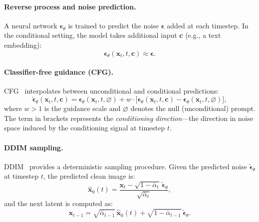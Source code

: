 \documentclass{article}
\begin{document}
\paragraph{Reverse process and noise prediction.}
A neural network $\boldsymbol{\epsilon}_\theta$ is trained to predict the noise $\boldsymbol{\epsilon}$ added at each timestep. In the conditional setting, the model takes additional input $\mathbf{c}$ (e.g., a text embedding):
\begin{equation}
    \boldsymbol{\epsilon}_\theta(\mathbf{x}_t, t, \mathbf{c}) \approx \boldsymbol{\epsilon}.
    \label{eq:noise_pred}
\end{equation}

\paragraph{Classifier-free guidance (CFG).}
CFG~\citep{ho2022classifier} interpolates between unconditional and conditional predictions:
\begin{equation}
    \tilde{\boldsymbol{\epsilon}}_\theta(\mathbf{x}_t, t, \mathbf{c}) = \boldsymbol{\epsilon}_\theta(\mathbf{x}_t, t, \varnothing) + w \cdot \bigl[\boldsymbol{\epsilon}_\theta(\mathbf{x}_t, t, \mathbf{c}) - \boldsymbol{\epsilon}_\theta(\mathbf{x}_t, t, \varnothing)\bigr],
    \label{eq:cfg}
\end{equation}
where $w > 1$ is the guidance scale and $\varnothing$ denotes the null (unconditional) prompt. The term in brackets represents the \emph{conditioning direction}---the direction in noise space induced by the conditioning signal at timestep $t$.

\paragraph{DDIM sampling.}
DDIM~\citep{song2021denoising} provides a deterministic sampling procedure. Given the predicted noise $\tilde{\boldsymbol{\epsilon}}_\theta$ at timestep $t$, the predicted clean image is:
\begin{equation}
    \hat{\mathbf{x}}_0(t) = \frac{\mathbf{x}_t - \sqrt{1 - \bar{\alpha}_t}\, \tilde{\boldsymbol{\epsilon}}_\theta}{\sqrt{\bar{\alpha}_t}},
    \label{eq:tweedie}
\end{equation}
and the next latent is computed as:
\begin{equation}
    \mathbf{x}_{t-1} = \sqrt{\bar{\alpha}_{t-1}}\, \hat{\mathbf{x}}_0(t) + \sqrt{1 - \bar{\alpha}_{t-1}}\, \tilde{\boldsymbol{\epsilon}}_\theta.
    \label{eq:ddim_step}
\end{equation}
\end{document}
